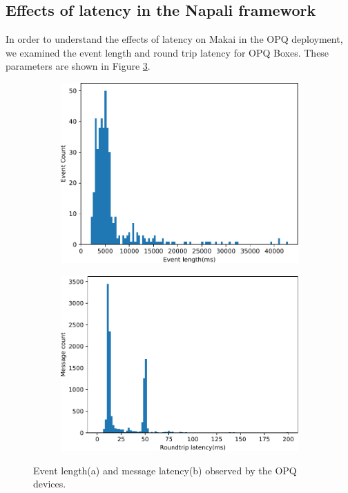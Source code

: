 \subsection{Effects of latency in the Napali framework}\label{subsec:effects-of-latency-in-the-napali-framework}

In order to understand the effects of latency on Makai in the OPQ deployment, we examined the event length and round trip latency for OPQ Boxes.
These parameters are shown in Figure \ref{expdes:fig:el_la}.

\begin{figure}[ht!]
    \centering
    \begin{subfigure}{.45\textwidth}
        \centering
        \includegraphics[width=1\linewidth]{img/napali_eval/event_length.pdf}
        \caption{}
        \label{expdes:fig:event_length}
    \end{subfigure}\hspace{5mm}
    \begin{subfigure}{.45\textwidth}
        \centering
        \includegraphics[width=1\linewidth]{img/napali_eval/latency.pdf}
        \caption{}
        \label{expdes:fig:latency}
    \end{subfigure}
    \caption{Event length(a) and message latency(b) observed by the OPQ devices.}

    \label{expdes:fig:el_la}
\end{figure}

